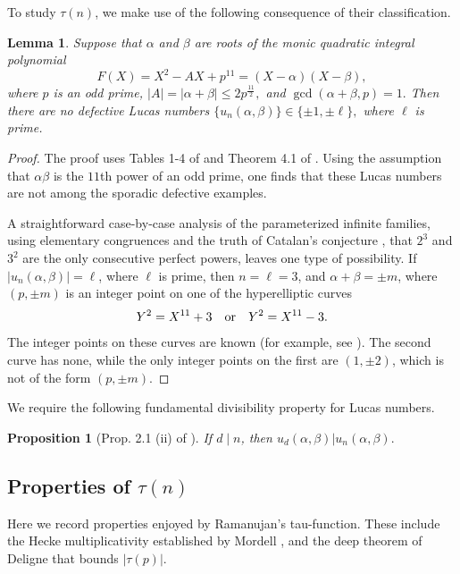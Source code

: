 \documentclass[12pt]{amsart}
\newtheorem{lem}{Lemma}[section]
\newtheorem{prop}[thm]{Proposition}
\numberwithin{equation}{section}
\begin{document}
To study $\tau(n)$, we make use of the following consequence of their classification.

\begin{lem}\label{Modularity}
Suppose that $\alpha$ and $\beta$ are roots of the monic quadratic integral polynomial
$$
F(X)=X^2-AX+p^{11}=(X-\alpha)(X-\beta),
$$
where $p$ is an odd prime, $|A|=|\alpha+\beta|\leq 2p^{\frac{11}{2}},$ and $\gcd(\alpha+\beta, p)=1.$ 
Then there are no defective Lucas numbers $\{u_n(\alpha,\beta)\}\in \{\pm 1, \pm \ell\},$ where $\ell$ is prime.
\end{lem}
\begin{proof}
The proof uses 
Tables 1-4 of \cite{BHV}  and Theorem 4.1 of \cite{Abouzaid}.  Using the assumption that $\alpha \beta$ is the $11$th power of an odd prime, one finds that
these
Lucas numbers are not among the sporadic defective examples. 

A straightforward case-by-case analysis of 
the parameterized infinite families,
using elementary congruences and the truth of Catalan's conjecture \cite{Catalan},
that $2^3$ and $3^2$ are the only consecutive perfect powers, leaves one type of possibility.
If $|u_n(\alpha,\beta)|=\ell$, where $\ell$ is prime, then $n=\ell=3$, and $\alpha+\beta=\pm m$, where
$(p,\pm m)$ is an integer point on one of the hyperelliptic curves
\begin{equation}\label{hyper1}
Y^2 =X^{11}+3 \ \ \ {\text {\rm or}}\ \ \ Y^2=X^{11}-3.
\end{equation}
The integer points on these curves are known (for example, see \cite{BMS, Cohn}).
The second curve has none, while the only integer points on the first are $(1, \pm 2)$, which is
not of the form $(p,\pm m)$.
\end{proof}

We require the following fundamental divisibility property for Lucas numbers.

\begin{prop}[Prop. 2.1 (ii) of \cite{BHV}]\label{PropA}  If $d\mid n$, then $u_d(\alpha, \beta) | u_n(\alpha,\beta).$
\end{prop}


\subsection{Properties of $\tau(n)$}

Here we record properties enjoyed by Ramanujan's tau-function.
 These include the Hecke multiplicativity established
by Mordell \cite{Mordell}, and 
 the deep theorem of Deligne  \cite{Deligne1, Deligne2} that bounds $|\tau(p)|.$ 
\end{document}
